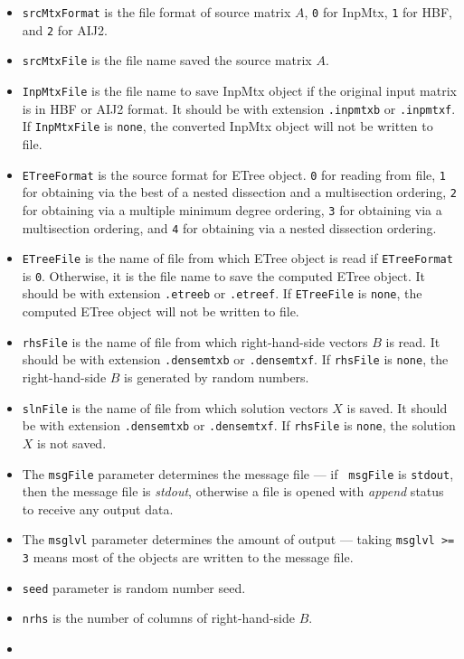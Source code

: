 \begin{enumerate}
\begin{itemize}
\item
{\tt srcMtxFormat} is the file format of source matrix $A$,
 {\tt 0} for InpMtx, {\tt 1} for HBF, and {\tt 2} for AIJ2.
\item
{\tt srcMtxFile} is the file name saved the source matrix $A$.
\item
{\tt InpMtxFile} is the file name to save InpMtx object if the 
  original input matrix is in HBF or AIJ2 format.  It should be with
  extension {\tt .inpmtxb} or {\tt .inpmtxf}.  If {\tt InpMtxFile} is
  {\tt none}, the converted InpMtx object will not be written to file.
\item
{\tt ETreeFormat} is the source format for ETree object.
 {\tt 0} for reading from file, {\tt 1} for obtaining via the best of a nested
 dissection and a multisection ordering, {\tt 2} for obtaining via a multiple 
 minimum degree ordering, {\tt 3} for obtaining via a multisection ordering, 
 and {\tt 4} for obtaining via a nested dissection ordering.
\item
{\tt ETreeFile} is the name of file from which ETree object is read 
  if {\tt ETreeFormat} is {\tt 0}.  Otherwise, it is the file name to
  save the computed ETree object.   It should be with
  extension {\tt .etreeb} or {\tt .etreef}.  If {\tt ETreeFile} is
  {\tt none}, the computed ETree object will not be written to file.
\item
{\tt rhsFile} is the name of file from which right-hand-side vectors $B$ 
  is read.  It should be with
  extension {\tt .densemtxb} or {\tt .densemtxf}.  If {\tt rhsFile} is
  {\tt none}, the  right-hand-side $B$ is generated by random numbers.
\item
{\tt slnFile} is the name of file from which solution vectors $X$ 
  is saved.  It should be with
  extension {\tt .densemtxb} or {\tt .densemtxf}.  If {\tt rhsFile} is
  {\tt none}, the solution $X$ is not saved.
\item
The {\tt msgFile} parameter determines the message file --- if {\tt
msgFile} is {\tt stdout}, then the message file is {\it stdout},
otherwise a file is opened with {\it append} status to receive any
output data.
\item
The {\tt msglvl} parameter determines the amount of output ---
taking {\tt msglvl >= 3} means most of the objects are written
to the message file.
\item
{\tt seed} parameter is random number seed.
\item
{\tt nrhs} is the number of columns of  right-hand-side $B$.
\item

\end{itemize}
\end{enumerate}
